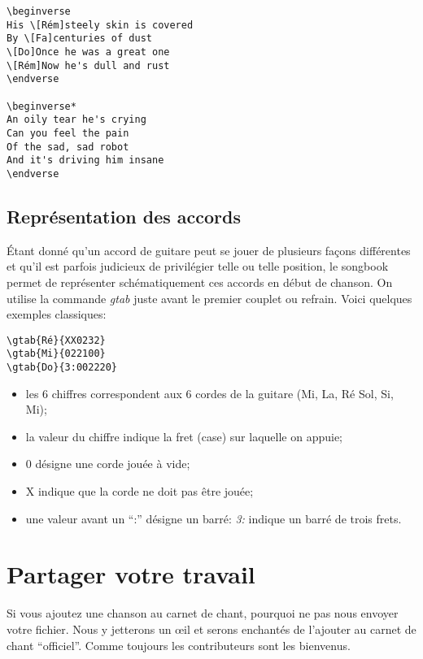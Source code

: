\documentclass[a4paper]{article}
\begin{document}
\begin{verbatim}
\beginverse
His \[Rém]steely skin is covered
By \[Fa]centuries of dust
\[Do]Once he was a great one
\[Rém]Now he's dull and rust
\endverse

\beginverse*
An oily tear he's crying
Can you feel the pain
Of the sad, sad robot
And it's driving him insane
\endverse
\end{verbatim}

\subsection{Représentation des accords}

Étant donné qu'un accord de guitare peut se jouer de plusieurs façons
différentes et qu'il est parfois judicieux de privilégier telle ou
telle position, le songbook permet de représenter schématiquement ces
accords en début de chanson. On utilise la commande \emph{gtab} juste
avant le premier couplet ou refrain. Voici quelques exemples classiques:

\begin{verbatim}
\gtab{Ré}{XX0232}
\gtab{Mi}{022100}
\gtab{Do}{3:002220}
\end{verbatim}

\begin{itemize}
\item les 6 chiffres correspondent aux 6 cordes de la
guitare (Mi, La, Ré Sol, Si, Mi);
\item la valeur du chiffre indique la fret (case) sur laquelle on
  appuie;
\item 0 désigne une corde jouée à vide;
\item X indique que la corde ne doit pas être jouée;
\item une valeur avant un ``:'' désigne un barré: \emph{3:} indique
un barré de trois frets.
\end{itemize}


\section{Partager votre travail}

Si vous ajoutez une chanson au carnet de chant, pourquoi ne pas nous
envoyer votre fichier. Nous y jetterons un \oe{}il et serons enchantés
de l'ajouter au carnet de chant ``officiel''. Comme toujours les
contributeurs sont les bienvenus.
\end{document}
